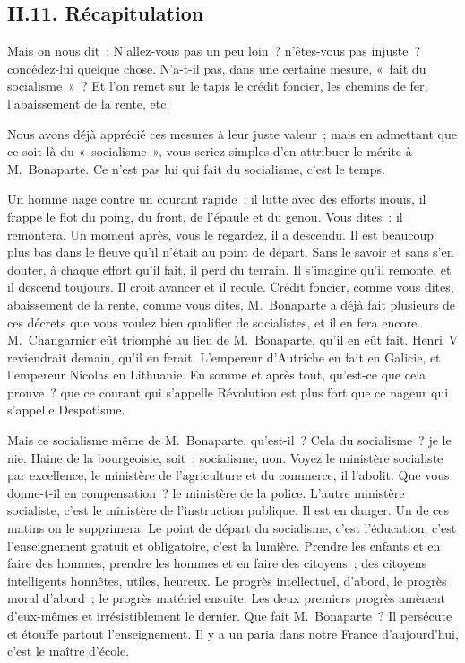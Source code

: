 \documentclass[french,twoside]{book} %
\begin{document}
\subsection[{II.11. Récapitulation}]{II.11. Récapitulation}
\noindent Mais on nous dit : N’allez-vous pas un peu loin ? n’êtes-vous pas injuste ? concédez-lui quelque chose. N’a-t-il pas, dans une certaine mesure, « fait du socialisme » ? Et l’on remet sur le tapis le crédit foncier, les chemins de fer, l’abaissement de la rente, etc.\par
Nous avons déjà apprécié ces mesures à leur juste valeur ; mais en admettant que ce soit là du « socialisme », vous seriez simples d’en attribuer le mérite à M. Bonaparte. Ce n’est pas lui qui fait du socialisme, c’est le temps.\par
Un homme nage contre un courant rapide ; il lutte avec des efforts inouïs, il frappe le flot du poing, du front, de l’épaule et du genou. Vous dites : il remontera. Un moment après, vous le regardez, il a descendu. Il est beaucoup plus bas dans le fleuve qu’il n’était au point de départ. Sans le savoir et sans s’en douter, à chaque effort qu’il fait, il perd du terrain. Il s’imagine qu’il remonte, et il descend toujours. Il croit avancer et il recule. Crédit foncier, comme vous dites, abaissement de la rente, comme vous dites, M. Bonaparte a déjà fait plusieurs de ces décrets que vous voulez bien qualifier de socialistes, et il en fera encore. M. Changarnier eût triomphé au lieu de M. Bonaparte, qu’il en eût fait. Henri V reviendrait demain, qu’il en ferait. L’empereur d’Autriche en fait en Galicie, et l’empereur Nicolas en Lithuanie. En somme et après tout, qu’est-ce que cela prouve ? que ce courant qui s’appelle Révolution est plus fort que ce nageur qui s’appelle Despotisme.\par
Mais ce socialisme même de M. Bonaparte, qu’est-il ? Cela du socialisme ? je le nie. Haine de la bourgeoisie, soit ; socialisme, non. Voyez le ministère socialiste par excellence, le ministère de l’agriculture et du commerce, il l’abolit. Que vous donne-t-il en compensation ? le ministère de la police. L’autre ministère socialiste, c’est le ministère de l’instruction publique. Il est en danger. Un de ces matins on le supprimera. Le point de départ du socialisme, c’est l’éducation, c’est l’enseignement gratuit et obligatoire, c’est la lumière. Prendre les enfants et en faire des hommes, prendre les hommes et en faire des citoyens ; des citoyens intelligents honnêtes, utiles, heureux. Le progrès intellectuel, d’abord, le progrès moral d’abord ; le progrès matériel ensuite. Les deux premiers progrès amènent d’eux-mêmes et irrésistiblement le dernier. Que fait M. Bonaparte ? Il persécute et étouffe partout l’enseignement. Il y a un paria dans notre France d’aujourd’hui, c’est le maître d’école.\par
\end{document}

